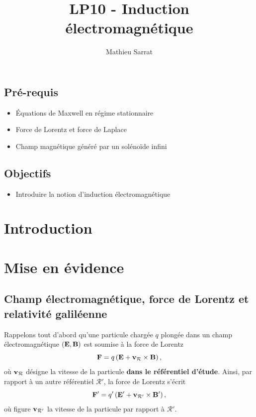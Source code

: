 \documentclass[11pt,a4paper]{report}
\author{Mathieu Sarrat}
\title{LP10 - Induction électromagnétique}
\begin{document}
\maketitle

\subsection{Pré-requis}
\begin{itemize}
	\item \'Equations de Maxwell en régime stationnaire
	\item Force de Lorentz et force de Laplace
	\item Champ magnétique généré par un solénoïde infini
\end{itemize}

\subsection{Objectifs}
\begin{itemize}
	\item Introduire la notion d'induction électromagnétique
\end{itemize}

\newpage
\section{Introduction}



\newpage
\section{Mise en évidence}

\subsection{Champ électromagnétique, force de Lorentz et relativité galiléenne}

Rappelons tout d'abord qu'une particule chargée $q$ plongée dans un champ électromagnétique $(\bold{E},\bold{B})$ est soumise à la force de Lorentz
\begin{equation}
	\bold{F} = q \left(\bold{E}+\bold{v}_\mathcal{R}\times\bold{B}\right),
\end{equation}
où $\bold{v}_\mathcal{R}$ désigne la vitesse de la particule \textbf{dans le référentiel d'étude}. Ainsi, par rapport à un autre référentiel $\mathcal{R}'$, la force de Lorentz s'écrit
\begin{equation}
	\bold{F}' = q' \left(\bold{E}'+\bold{v}_{\mathcal{R}'}\times\bold{B}'\right),
\end{equation}
où figure $\bold{v}_{\mathcal{R}'}$ la vitesse de la particule par rapport à $\mathcal{R}'$.
\end{document}
